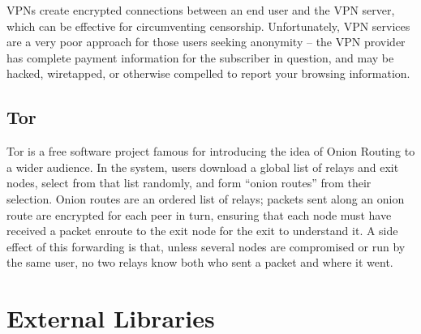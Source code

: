 \documentclass{article}
\begin{document}
VPNs create encrypted connections between an end user and the VPN
server, which can be effective for circumventing
censorship. Unfortunately, VPN services are a very poor approach for
those users seeking anonymity – the VPN provider has complete payment
information for the subscriber in question, and may be hacked,
wiretapped, or otherwise compelled to report your browsing
information.

\subsection{Tor}

Tor  is a free software project famous for introducing the
idea of Onion Routing to a wider audience. In the system, users
download a global list of relays and exit nodes, select from that list
randomly, and form ``onion routes'' from their selection. Onion routes
are an ordered list of relays; packets sent along an onion route are
encrypted for each peer in turn, ensuring that each node must have
received a packet enroute to the exit node for the exit to understand
it. A side effect of this forwarding is that, unless several nodes are
compromised or run by the same user, no two relays know both who sent
a packet and where it went.








\section{External Libraries}
\label{sec:external-libraries}
\end{document}

